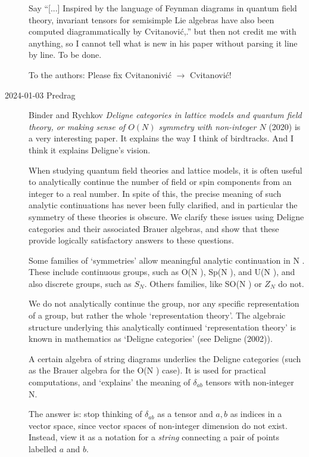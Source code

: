 \begin{description}
Say ``[...] Inspired by the language of Feynman diagrams in quantum field
theory, invariant tensors for semisimple Lie algebras have also been
computed diagrammatically by Cvitanovi{\'c},.'' but then not
credit me with anything,  so I cannot tell what is new in his paper
without parsing it line by line. To be done.

To the authors: Please fix Cvitanonivi{\'c} $\to$ Cvitanovi{\'c}!

\item[2024-01-03 Predrag]
Binder and Rychkov
{\em Deligne categories in lattice models and quantum field theory, or
making sense of {$O(N)$} symmetry with non-integer {$N$}}
(2020) is a very interesting paper. It explains the way I think of birdtracks.
And I think it explains Deligne's vision.

When studying quantum field theories and lattice models, it is often useful
to analytically continue the number of field or spin components from an integer to a real
number. In spite of this, the precise meaning of such analytic continuations has never been
fully clarified, and in particular the symmetry of these theories is obscure. We clarify these
issues using Deligne categories and their associated Brauer algebras, and show that these
provide logically satisfactory answers to these questions.

Some families of `symmetries' allow meaningful analytic continuation in N . These
include continuous groups, such as O(N ), Sp(N ), and U(N ), and also discrete groups,
such as $S_N$. Others families, like SO(N ) or  $Z_N$ do not.

We do not analytically continue the group, nor any specific representation of a group,
but rather the whole `representation theory'. The algebraic structure underlying this
analytically continued `representation theory' is known in mathematics as `Deligne
categories' (see 
{Deligne (2002)}).

A certain algebra of string diagrams underlies the Deligne categories
(such as the Brauer algebra for the O(N ) case). It is used for practical
computations, and `explains' the meaning of $\delta_{ab}$ tensors with
non-integer N.

The answer is: stop thinking of $\delta_{ab}$ as a tensor and ${a,b}$ as
indices in a vector space, since vector spaces of non-integer dimension
do not exist. Instead, view it as a notation for a \emph{string}
connecting a pair of points labelled ${a}$ and ${b}$.


\end{description}

